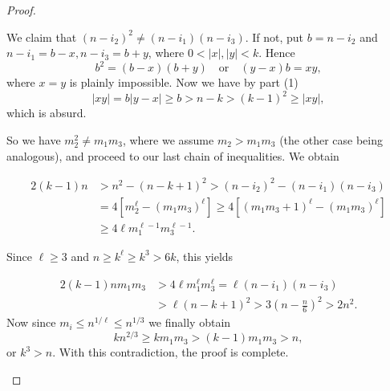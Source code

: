 \begin{proof}
\begin{enumerate}
    We claim that \((n - i_2)^2 \neq (n - i_1)(n - i_3)\). If not, put \(b = n - i_2\)
    and \(n - i_1 = b - x, n - i_3 = b + y\), where \(0 < |x|, |y| < k\). Hence
    \[
    b^2 = (b - x)(b + y) \quad \text{or} \quad (y - x)b = xy,
    \]
    where \(x = y\) is plainly impossible. Now we have by part (1)
    \[
    |xy| = b |y - x| \geq b > n - k > (k - 1)^2 \geq |xy|,
    \]
    which is absurd.

    So we have \(m_2^2 \neq m_1 m_3\), where we assume \(m_2 > m_1 m_3\) (the other case being analogous),
    and proceed to our last chain of inequalities. We obtain

    \begin{align}
    2(k - 1)n & > n^2 - (n - k + 1)^2 > (n - i_2)^2 - (n - i_1)(n - i_3)\\
     & = 4[m_2^\ell - (m_1 m_3)^\ell] \geq 4[(m_1 m_3 + 1)^\ell - (m_1 m_3)^\ell] \\
     & \geq 4 \ell m_1^{\ell-1} m_3^{\ell-1}.
    \end{align}

    Since \(\ell \geq 3\) and \(n \geq k^\ell \geq k^3 > 6k\), this yields

    \begin{align}
    2(k - 1)n m_1 m_3 & > 4 \ell m_1^\ell m_3^\ell = \ell (n - i_1)(n - i_3) \\
                      & > \ell (n - k + 1)^2 > 3(n - \frac{n}{6})^2 > 2n^2.
    \end{align}
    Now since \(m_i \le n^{1/\ell} \le n ^{1/3}\) we finally obtain
    \[
    kn^{2/3} \ge km_1m_3 > (k - 1)m_1m_3 > n,
    \]
    or \(k^3>n\). With this contradiction, the proof is complete.

    \end{enumerate}
\end{proof}
